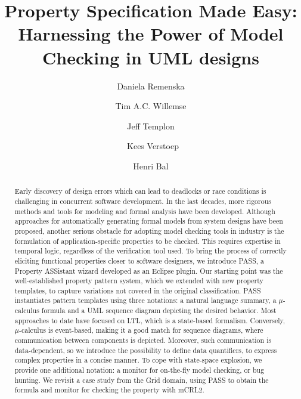 \documentclass[letter]{llncs}
\begin{document}
\title{Property Specification Made Easy: Harnessing the Power of Model Checking in UML designs}

\author{Daniela Remenska
\and Tim A.C. Willemse \and Jeff Templon \and\
Kees Verstoep \and Henri Bal}
%


\maketitle

\begin{abstract}
Early discovery of design errors which can lead to deadlocks or race conditions is 
challenging in concurrent software development. 
In the last decades, more rigorous
methods and tools for modeling and formal analysis have been developed. 
Although approaches for automatically generating formal models from system designs have 
been proposed, another serious obstacle for adopting model checking tools in industry
is the formulation of application-specific properties to be checked. 
This requires expertise in temporal logic, regardless of the verification tool used.
To bring the process of correctly eliciting functional properties closer to software 
designers, we introduce PASS, a Property ASSistant wizard developed 
as an Eclipse plugin. Our starting point was the well-established property pattern system,
which we extended with new property templates, to capture variations not covered 
in the original classification. PASS instantiates pattern templates using three notations: a natural language summary, a $\mu$-calculus formula
and a UML sequence diagram depicting the desired behavior. Most approaches to date 
have focused on LTL, which is a state-based formalism. Conversely,
 $\mu$-calculus is event-based, making it a good match for sequence diagrams, where communication between
 components is depicted. 
Moreover, such communication is data-dependent, so we introduce
the possibility to define data quantifiers, to express complex properties in a concise manner.
To cope with state-space explosion, we provide one additional notation: a monitor for on-the-fly model checking, or bug hunting.
We revisit a case study from the Grid domain, using PASS to obtain the
formula and monitor for checking the property with mCRL2.
\end{abstract}
\end{document}
